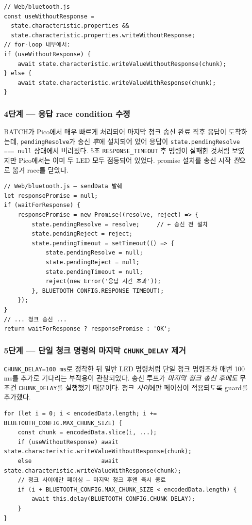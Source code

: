 \documentclass[11pt, oneside]{article}
\begin{document}
\begin{verbatim}
// Web/bluetooth.js
const useWithoutResponse =
  state.characteristic.properties &&
  state.characteristic.properties.writeWithoutResponse;
// for-loop 내부에서:
if (useWithoutResponse) {
    await state.characteristic.writeValueWithoutResponse(chunk);
} else {
    await state.characteristic.writeValueWithResponse(chunk);
}
\end{verbatim}

\subsubsection*{4단계 --- 응답 race condition 수정}

BATCH가 Pico에서 매우 빠르게 처리되어 마지막 청크 송신 완료 직후 응답이
도착하는데, \texttt{pendingResolve}가 송신 \emph{후}에 설치되어 있어 응답이
\texttt{state.pendingResolve === null} 상태에서 버려졌다. 5초
\texttt{RESPONSE\_TIMEOUT} 후 명령이 실패한 것처럼 보였지만 Pico에서는
이미 두 LED 모두 점등되어 있었다. promise 설치를 송신 시작 \emph{전}으로
옮겨 race를 닫았다.

\begin{verbatim}
// Web/bluetooth.js — sendData 발췌
let responsePromise = null;
if (waitForResponse) {
    responsePromise = new Promise((resolve, reject) => {
        state.pendingResolve = resolve;     // ← 송신 전 설치
        state.pendingReject = reject;
        state.pendingTimeout = setTimeout(() => {
            state.pendingResolve = null;
            state.pendingReject = null;
            state.pendingTimeout = null;
            reject(new Error('응답 시간 초과'));
        }, BLUETOOTH_CONFIG.RESPONSE_TIMEOUT);
    });
}
// ... 청크 송신 ...
return waitForResponse ? responsePromise : 'OK';
\end{verbatim}

\subsubsection*{5단계 --- 단일 청크 명령의 마지막 \texttt{CHUNK\_DELAY} 제거}

\texttt{CHUNK\_DELAY=100\,ms}로 정착한 뒤 일반 LED 명령처럼 단일 청크
명령조차 매번 100\,ms를 추가로 기다리는 부작용이 관찰되었다. 송신 루프가
\emph{마지막 청크 송신 후에도} 무조건 \texttt{CHUNK\_DELAY}를 실행했기
때문이다. 청크 \emph{사이}에만 페이싱이 적용되도록 guard를 추가했다.

\begin{verbatim}
for (let i = 0; i < encodedData.length; i += BLUETOOTH_CONFIG.MAX_CHUNK_SIZE) {
    const chunk = encodedData.slice(i, ...);
    if (useWithoutResponse) await state.characteristic.writeValueWithoutResponse(chunk);
    else                    await state.characteristic.writeValueWithResponse(chunk);
    // 청크 사이에만 페이싱 — 마지막 청크 후엔 즉시 종료
    if (i + BLUETOOTH_CONFIG.MAX_CHUNK_SIZE < encodedData.length) {
        await this.delay(BLUETOOTH_CONFIG.CHUNK_DELAY);
    }
}
\end{verbatim}
\end{document}
